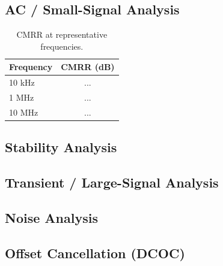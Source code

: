 \documentclass[12pt, a4paper]{article}
\begin{document}
\subsection{AC / Small-Signal Analysis}

\begin{table}[H]
    \centering
    \begin{tabular}{@{} l c @{}}
        \toprule
        \textbf{Frequency} & \textbf{CMRR (dB)} \\
        \midrule
        10 kHz & ... \\
        1 MHz  & ... \\
        10 MHz & ... \\
        \bottomrule
    \end{tabular}
    \caption{CMRR at representative frequencies.}
\end{table}

\subsection{Stability Analysis}

\subsection{Transient / Large-Signal Analysis}

\subsection{Noise Analysis}

\subsection{Offset Cancellation (DCOC)}
\end{document}
